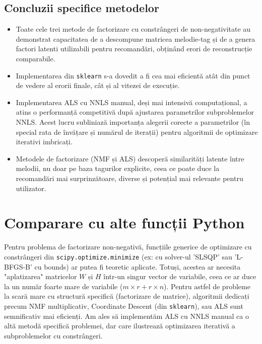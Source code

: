 \documentclass[12pt,a4paper]{article}
\begin{document}
	\subsection{Concluzii specifice metodelor}
	\begin{itemize}
		\item Toate cele trei metode de factorizare cu constrângeri de non-negativitate au demonstrat capacitatea de a descompune matricea melodie-tag și de a genera factori latenti utilizabili pentru recomandări, obținând erori de reconstrucție comparabile.
		\item Implementarea din \texttt{sklearn} s-a dovedit a fi cea mai eficientă atât din punct de vedere al erorii finale, cât și al vitezei de execuție.
		\item Implementarea ALS cu NNLS manual, deși mai intensivă computațional, a atins o performanță competitivă după ajustarea parametrilor subproblemelor NNLS. Acest lucru subliniază importanța alegerii corecte a parametrilor (în special rata de învățare și numărul de iterații) pentru algoritmii de optimizare iterativi imbricați.
		\item Metodele de factorizare (NMF și ALS) descoperă similarități latente între melodii, nu doar pe baza tagurilor explicite, ceea ce poate duce la recomandări mai surprinzătoare, diverse și potențial mai relevante pentru utilizator.
	\end{itemize}
	
	\section{Comparare cu alte funcții Python}
	Pentru problema de factorizare non-negativă, funcțiile generice de optimizare cu constrângeri din \texttt{scipy.optimize.minimize} (ex: cu solver-ul 'SLSQP' sau 'L-BFGS-B' cu bounds) ar putea fi teoretic aplicate. Totuși, acestea ar necesita "aplatizarea" matricelor $W$ și $H$ într-un singur vector de variabile, ceea ce ar duce la un număr foarte mare de variabile ($m \times r + r \times n$). Pentru astfel de probleme la scară mare cu structură specifică (factorizare de matrice), algoritmii dedicați precum NMF multiplicativ, Coordinate Descent (din \texttt{sklearn}), sau ALS sunt semnificativ mai eficienți. Am ales să implementăm ALS cu NNLS manual ca o altă metodă specifică problemei, dar care ilustrează optimizarea iterativă a subproblemelor cu constrângeri.
	
\end{document}
